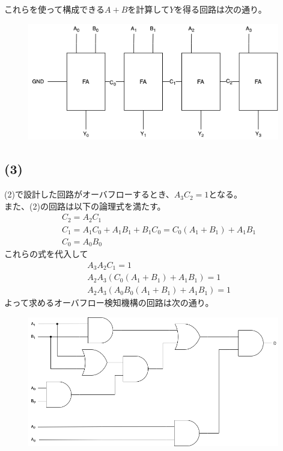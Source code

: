 \documentclass[a4paper,12pt,xelatex,ja=standard]{bxjsarticle}
\begin{document}
  これらを使って構成できる$A+B$を計算して$Y$を得る回路は次の通り。
  \begin{figure}[H]
    \centering
    \includegraphics[width=11cm]{images/ripple_carry_adder.png}
  \end{figure}

  \subsection*{(3)}
  (2)で設計した回路がオーバフローするとき、$A_3 C_2 = 1$となる。\\
  また、(2)の回路は以下の論理式を満たす。
  \begin{equation*}
    \begin{split}
      &C_2 = A_2 C_1 \\
      &C_1 = A_1 C_0 + A_1 B_1 + B_1 C_0 = C_0(A_1 + B_1) + A_1 B_1 \\
      &C_0 = A_0 B_0
    \end{split}
  \end{equation*}
  これらの式を代入して
  \begin{equation*}
    \begin{split}
      &A_3 A_2 C_1 = 1 \\
      &A_2 A_3 (C_0(A_1 + B_1) + A_1 B_1) = 1 \\
      &A_2 A_3 (A_0 B_0(A_1 + B_1) + A_1 B_1) = 1
    \end{split}
  \end{equation*}
  よって求めるオーバフロー検知機構の回路は次の通り。
  \begin{figure}[H]
    \centering
    \includegraphics[width=11cm]{images/overflow_detector.png}
  \end{figure}
\end{document}
